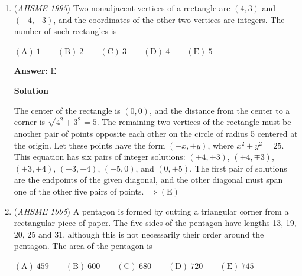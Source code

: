 \begin{enumerate}
 \textbf{Answer: }B



\textbf{Solution}

The probability of $ab$ being odd is $\left(\frac 35\right)^2 = \frac{9}{25}$, so the probability of $ab$ being even is $1 - \frac{9}{25} = \frac {16}{25}$.

 The probability of $c$ being odd is $3/5$ and being even is $2/5$
$ab+c$ is even if $ab$ and $c$ are both odd, with probability $\frac{9}{25} \cdot \frac{3}{5} = \frac{27}{125}$; or $ab$ and $c$ are both even, with probability $\frac{16}{25} \cdot \frac{2}{5} = \frac{32}{125}$. Thus the total probability is $\frac{59}{125} \Rightarrow \mathrm{(B)}$.

 


	\item (\textit{AHSME 1995}) Two nonadjacent vertices of a rectangle are $(4,3)$ and $(-4,-3)$, and the coordinates of the other two vertices are integers. The number of such rectangles is


 $\mathrm{(A) \ 1 } \qquad \mathrm{(B) \ 2 } \qquad \mathrm{(C) \ 3 } \qquad \mathrm{(D) \ 4 } \qquad \mathrm{(E) \ 5 }$

 \textbf{Answer: }E



\textbf{Solution}

The center of the rectangle is $(0,0)$, and the distance from the center to a corner is $\sqrt{4^2+3^2}=5$. The remaining two vertices of the rectangle must be another pair of points opposite each other on the circle of radius 5 centered at the origin. Let these points have the form $(\pm x,\pm y)$, where $x^2+y^2=25$. This equation has six pairs of integer solutions: $(\pm 4, \pm 3)$, $(\pm 4, \mp 3)$, $(\pm 3, \pm 4)$, $(\pm 3, \mp 4)$, $(\pm 5, 0)$, and $(0, \pm 5)$. The first pair of solutions are the endpoints of the given diagonal, and the other diagonal must span one of the other five pairs of points. $\Rightarrow \mathrm{(E)}$



	\item (\textit{AHSME 1995}) A pentagon is formed by cutting a triangular corner from a rectangular piece of paper. The five sides of the pentagon have lengths 13, 19, 20, 25 and 31, although this is not necessarily their order around the pentagon. The area of the pentagon is


 $\mathrm{(A) \ 459 } \qquad \mathrm{(B) \ 600 } \qquad \mathrm{(C) \ 680 } \qquad \mathrm{(D) \ 720 } \qquad \mathrm{(E) \ 745 }$


\end{enumerate}
